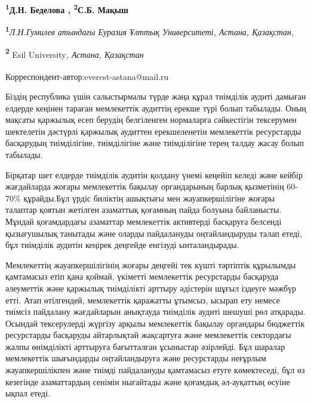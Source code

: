 
\begin{articleheader}

{\bfseries
\textsuperscript{1}Д.Н. Беделова\textsuperscript{\envelope } ,
\textsuperscript{2}С.Б. Мақыш}
\end{articleheader}

\begin{affiliation}
{\bfseries \textsuperscript{1}}\emph{Л.Н.Гумилев атындағы Еуразия Ұлттық Университеті, Астана, Қазақстан,}

{\bfseries \textsuperscript{2}} Esil University\emph{, Астана, Қазақстан}

{\bfseries \textsuperscript{\envelope }}Корреспондент-автор:everest-astana@mail.ru
\end{affiliation}

Біздің республика үшін салыстырмалы түрде жаңа құрал тиімділік аудиті
дамыған елдерде кеңінен тараған мемлекеттік аудиттің ерекше түрі болып
табылады. Оның мақсаты қаржылық есеп берудің белгіленген нормаларға
сәйкестігін тексерумен шектелетін дәстүрлі қаржылық аудиттен
ерекшеленетін мемлекеттік ресурстарды басқарудың тиімділігіне,
тиімділігіне және тиімділігіне терең талдау жасау болып табылады.

Бірқатар шет елдерде тиімділік аудитін қолдану үнемі кеңейіп келеді және
кейбір жағдайларда жоғары мемлекеттік бақылау органдарының барлық
қызметінің 60-70\% құрайды.Бұл үрдіс биліктің ашықтығы мен
жауапкершілігіне жоғары талаптар қоятын жетілген азаматтық қоғамның
пайда болуына байланысты. Мұндай қоғамдардағы азаматтар мемлекеттік
активтерді басқаруға белсенді қызығушылық танытады және оларды
пайдалануды оңтайландыруды талап етеді, бұл тиімділік аудитін кеңірек
деңгейде енгізуді ынталандырады.

Мемлекеттің жауапкершілігінің жоғары деңгейі тек күшті тәртіптік
құрылымды қамтамасыз етіп қана қоймай, үкіметті мемлекеттік ресурстарды
басқаруда әлеуметтік және қаржылық тиімділікті арттыру әдістерін шұғыл
іздеуге мәжбүр етті. Атап өтілгендей, мемлекеттік қаражатты ұтымсыз,
ысырап ету немесе тиімсіз пайдалану жағдайларын анықтауда тиімділік
аудиті шешуші рөл атқарады. Осындай тексерулерді жүргізу арқылы
мемлекеттік бақылау органдары бюджеттік ресурстарды басқаруды
айтарлықтай жақсартуға және мемлекеттік сектордағы жалпы өнімділікті
арттыруға бағытталған ұсыныстар әзірлейді. Бұл шаралар мемлекеттік
шығындарды оңтайландыруға және ресурстарды неғұрлым жауапкершілікпен
және тиімді пайдалануды қамтамасыз етуге көмектеседі, бұл өз кезегінде
азаматтардың сенімін нығайтады және қоғамдық әл-ауқаттың өсуіне ықпал
етеді.


